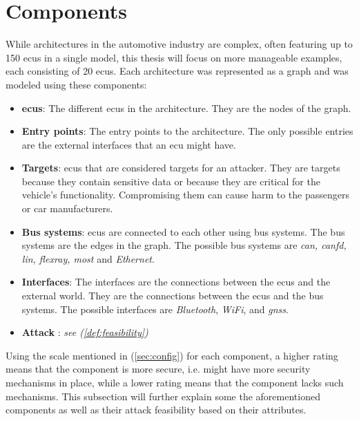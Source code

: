 \section{Components}
\label{sec:components}

While architectures in the automotive industry are complex, often featuring up to 150 \acrshort{ecu}s in a single model, 
this thesis will focus on more manageable examples, each consisting of 20 \acrshort{ecu}s.
Each architecture was represented as a graph and was modeled using these components:

\begin{itemize}

    \item \textbf{\acrlong{ecu}s}: The different \acrshort{ecu}s in the architecture. 
        They are the nodes of the graph.
    
    \item \textbf{Entry points}: The entry points to the architecture. 
        The only possible entries are the external interfaces that an \acrshort{ecu} might have.
    
    \item \textbf{Targets}: \acrshort{ecu}s that are considered targets for an attacker. 
        They are targets because they contain sensitive data or because they are critical for the vehicle's functionality.
        Compromising them can cause harm to the passengers or car manufacturers.
    
    \item \textbf{Bus systems}: \acrshort{ecu}s are connected to each other using bus systems. The bus systems are the edges in the graph. 
        The possible bus systems are \textit{\acrshort{can}, \acrshort{canfd}, \acrshort{lin}, \acrshort{flexray}, \acrshort{most}} and \textit{Ethernet}.
    
    \item \textbf{Interfaces}: The interfaces are the connections between the \acrshort{ecu}s and the external world. They are the connections between the \acrshort{ecu}s and the bus systems. 
        The possible interfaces are \textit{Bluetooth}, \textit{WiFi}, and \textit{\acrshort{gnss}}.
    
    \item \textbf{Attack }: \textit{see (\ref{def:feasibility})}
    
\end{itemize}

Using the scale mentioned in (\ref{sec:config}) for each component, a higher rating means that the component is more secure, i.e. might have more security mechanisms in place,
while a lower rating means that the component lacks such mechanisms.
This subsection will further explain some the aforementioned components as well as their attack feasibility based on their attributes.

